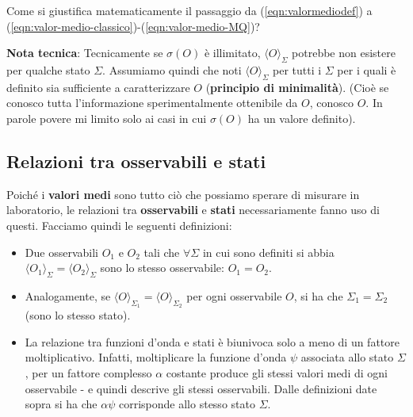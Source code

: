\documentclass[FisicaTeorica.tex]{subfiles}
\begin{document}
\begin{question}
Come si giustifica matematicamente il passaggio da (\ref{eqn:valormediodef}) a (\ref{eqn:valor-medio-classico})-(\ref{eqn:valor-medio-MQ})?
\label{q:giustificazione-prob}
\end{question}
\textbf{Nota tecnica}: Tecnicamente se $\sigma(O)$ è illimitato, $\langle O \rangle_\Sigma$ potrebbe non esistere per qualche stato $\Sigma$. Assumiamo quindi che noti $\langle O \rangle_\Sigma$  per tutti i $\Sigma$ per i quali è definito sia sufficiente a caratterizzare $O$ (\textbf{principio di minimalità}). (Cioè se conosco tutta l'informazione sperimentalmente ottenibile da $O$, conosco $O$. In parole povere mi limito solo ai casi in cui $\sigma(O)$ ha un valore definito).

\subsection{Relazioni tra osservabili e stati}
Poiché i \textbf{valori medi} sono tutto ciò che possiamo sperare di misurare in laboratorio, le relazioni tra \textbf{osservabili} e \textbf{stati} necessariamente fanno uso di questi. Facciamo quindi le seguenti definizioni:
\begin{itemize}
    \item Due osservabili   $O_1$ e $O_2$ tali che $\forall \Sigma$ in cui sono definiti si abbia $\langle O_1 \rangle_\Sigma = \langle O_2 \rangle_\Sigma$ sono lo stesso osservabile: $O_1 = O_2$.
    \item Analogamente,  se $\langle O \rangle_{\Sigma_1} = \langle O \rangle_{\Sigma_2}$ per ogni osservabile $O$, si ha che $\Sigma_1 = \Sigma_2$ (sono lo stesso stato).
    \item La relazione tra funzioni d'onda e stati è biunivoca solo a meno di un fattore moltiplicativo. Infatti, moltiplicare la funzione d'onda $\psi$ associata allo stato $\Sigma$, per un fattore complesso $\alpha$ costante produce gli stessi valori medi di ogni osservabile - e quindi descrive gli stessi osservabili. Dalle definizioni date sopra si ha che $\alpha \psi$ corrisponde allo stesso stato $\Sigma$.
\end{itemize}
\end{document}

